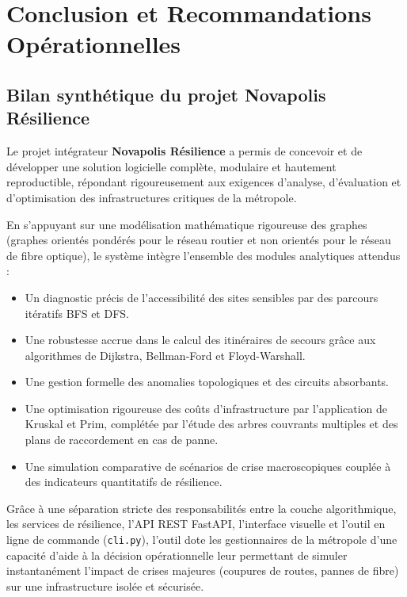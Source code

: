 \section{Conclusion et Recommandations Opérationnelles}

\subsection{Bilan synthétique du projet Novapolis Résilience}
Le projet intégrateur \textbf{Novapolis Résilience} a permis de concevoir et de développer une solution logicielle complète, modulaire et hautement reproductible, répondant rigoureusement aux exigences d'analyse, d'évaluation et d'optimisation des infrastructures critiques de la métropole. 

En s'appuyant sur une modélisation mathématique rigoureuse des graphes (graphes orientés pondérés pour le réseau routier et non orientés pour le réseau de fibre optique), le système intègre l'ensemble des modules analytiques attendus :
\begin{itemize}
    \item Un diagnostic précis de l'accessibilité des sites sensibles par des parcours itératifs BFS et DFS.
    \item Une robustesse accrue dans le calcul des itinéraires de secours grâce aux algorithmes de Dijkstra, Bellman-Ford et Floyd-Warshall.
    \item Une gestion formelle des anomalies topologiques et des circuits absorbants.
    \item Une optimisation rigoureuse des coûts d'infrastructure par l'application de Kruskal et Prim, complétée par l'étude des arbres couvrants multiples et des plans de raccordement en cas de panne.
    \item Une simulation comparative de scénarios de crise macroscopiques couplée à des indicateurs quantitatifs de résilience.
\end{itemize}

Grâce à une séparation stricte des responsabilités entre la couche algorithmique, les services de résilience, l'API REST FastAPI, l'interface visuelle et l'outil en ligne de commande (\texttt{cli.py}), l'outil dote les gestionnaires de la métropole d'une capacité d'aide à la décision opérationnelle leur permettant de simuler instantanément l'impact de crises majeures (coupures de routes, pannes de fibre) sur une infrastructure isolée et sécurisée.

